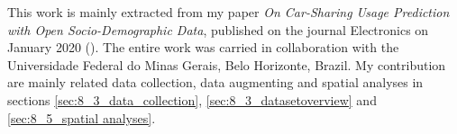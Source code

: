 
This work is mainly extracted from my paper \textit{On Car-Sharing Usage Prediction with Open Socio-Demographic Data}, published on the journal Electronics on January 2020 (\cite{cocca2020predictions}). The entire work was carried in collaboration with the Universidade Federal do Minas Gerais, Belo Horizonte, Brazil. My contribution are mainly related data collection, data augmenting and spatial analyses in sections \ref{sec:8_3_data_collection}, \ref{sec:8_3_datasetoverview} and \ref{sec:8_5_spatial analyses}.




